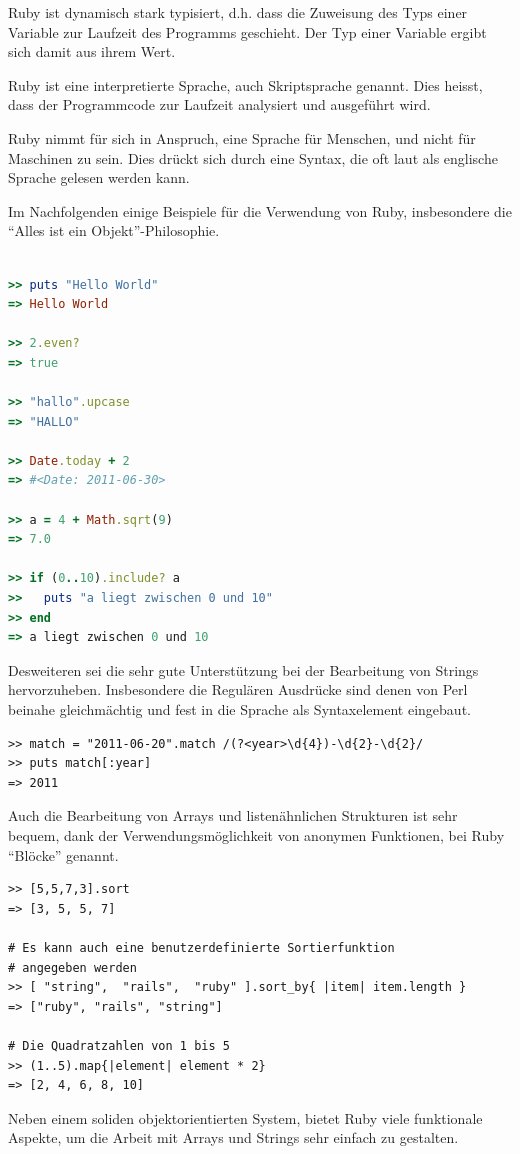 Ruby ist dynamisch stark typisiert, d.h. dass die Zuweisung des Typs einer Variable zur Laufzeit des Programms geschieht. Der Typ einer Variable ergibt sich damit aus ihrem Wert.

Ruby ist eine interpretierte Sprache, auch Skriptsprache genannt. Dies heisst, dass der Programmcode zur Laufzeit analysiert und ausgeführt wird. 

Ruby nimmt für sich in Anspruch, eine Sprache für Menschen, und nicht für Maschinen zu sein. Dies drückt sich durch eine Syntax, die oft laut als englische Sprache gelesen werden kann. 

\setlength{\epigraphwidth}{\marginparwidth}
\setlength{\epigraphwidth}{0.8\textwidth}

Im Nachfolgenden einige Beispiele für die Verwendung von Ruby, insbesondere die "`Alles ist ein Objekt"'-Philosophie.

\begin{lstlisting}[language=Ruby,label=Ruby Beispiele,caption=Ruby Beispiele]
 
>> puts "Hello World"
=> Hello World

>> 2.even?
=> true

>> "hallo".upcase
=> "HALLO"

>> Date.today + 2
=> #<Date: 2011-06-30>

>> a = 4 + Math.sqrt(9)
=> 7.0

>> if (0..10).include? a
>>   puts "a liegt zwischen 0 und 10"
>> end
=> a liegt zwischen 0 und 10

\end{lstlisting}

Desweiteren sei die sehr gute Unterstützung bei der Bearbeitung von Strings hervorzuheben. Insbesondere die Regulären Ausdrücke sind denen von Perl beinahe gleichmächtig und fest in die Sprache als Syntaxelement eingebaut.

\begin{lstlisting}
>> match = "2011-06-20".match /(?<year>\d{4})-\d{2}-\d{2}/
>> puts match[:year]
=> 2011
\end{lstlisting}

Auch die Bearbeitung von Arrays und listenähnlichen Strukturen ist sehr bequem, dank der Verwendungsmöglichkeit von anonymen Funktionen, bei Ruby "`Blöcke"' genannt.

\begin{lstlisting}
>> [5,5,7,3].sort
=> [3, 5, 5, 7]

# Es kann auch eine benutzerdefinierte Sortierfunktion
# angegeben werden
>> [ "string",  "rails",  "ruby" ].sort_by{ |item| item.length }
=> ["ruby", "rails", "string"]

# Die Quadratzahlen von 1 bis 5
>> (1..5).map{|element| element * 2}
=> [2, 4, 6, 8, 10]
\end{lstlisting}
Neben einem soliden objektorientierten System, bietet Ruby viele funktionale Aspekte, um die Arbeit mit Arrays und Strings sehr einfach zu gestalten. 

